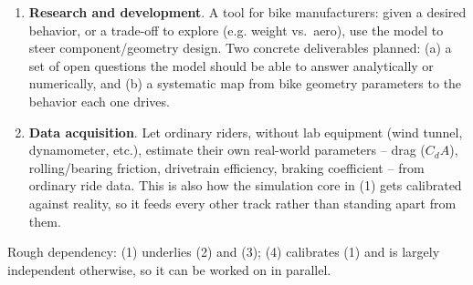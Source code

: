 \begin{enumerate}
    \begin{itemize}
        \item \emph{Optimization}: given an objective (performance / time / velocity) and constraints, find the input (rider effort profile, line, gearing, \dots) that achieves it. Target order: road bike first (most predictable/constrained), then BMX, then MTB (least predictable -- terrain and technical variability dominate).
        \item \emph{Strategy}: combine an energy model (rider/team energy expenditure and availability) with a strategy model (tactical choices -- drafting, attacks, team formations) to generate multiple possible race outcomes, the way F1 strategy simulation does -- surfacing which choices let a rider or team win, or maximize some other goal, rather than solving a single fixed objective directly. Planned starting point: define a rider power curve (or equivalent) as the energy-model primitive.
    \end{itemize}
    \item \textbf{Research and development}. A tool for bike manufacturers: given a desired behavior, or a trade-off to explore (e.g. weight vs.\ aero), use the model to steer component/geometry design. Two concrete deliverables planned: (a) a set of open questions the model should be able to answer analytically or numerically, and (b) a systematic map from bike geometry parameters to the behavior each one drives.
    \item \textbf{Data acquisition}. Let ordinary riders, without lab equipment (wind tunnel, dynamometer, etc.), estimate their own real-world parameters -- drag ($C_dA$), rolling/bearing friction, drivetrain efficiency, braking coefficient -- from ordinary ride data. This is also how the simulation core in (1) gets calibrated against reality, so it feeds every other track rather than standing apart from them.
\end{enumerate}

Rough dependency: (1) underlies (2) and (3); (4) calibrates (1) and is largely independent otherwise, so it can be worked on in parallel.
